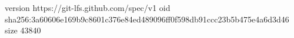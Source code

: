 version https://git-lfs.github.com/spec/v1
oid sha256:3a60606e169b9c8601c376e84ed489096ff0f598db91ccc23b5b475e4a6d3d46
size 43840
